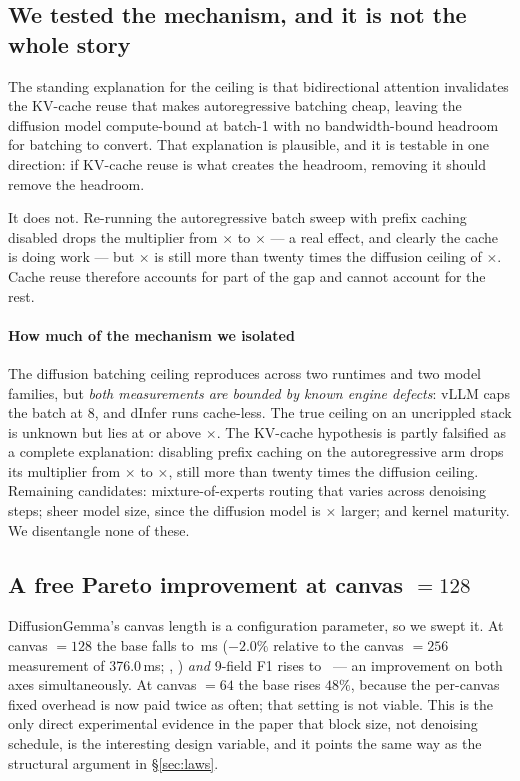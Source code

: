 \subsection{We tested the mechanism, and it is not the whole story}

The standing explanation for the ceiling is that bidirectional attention
invalidates the KV-cache reuse that makes autoregressive batching cheap,
leaving the diffusion model compute-bound at batch-1 with no bandwidth-bound
headroom for batching to convert. That explanation is plausible, and it is
testable in one direction: if KV-cache reuse is what creates the headroom,
removing it should remove the headroom.

It does not. Re-running the autoregressive batch sweep with prefix caching
disabled drops the multiplier from \cacheOnMult$\times$ to
\cacheOffMult$\times$ --- a real effect, and clearly the cache is doing work
--- but \cacheOffMult$\times$ is still more than twenty times the diffusion
ceiling of \dgBatchMult$\times$. Cache reuse therefore accounts for part of
the gap and cannot account for the rest.

\paragraph{How much of the mechanism we isolated}
The diffusion batching ceiling reproduces across two runtimes and two model
families, but \emph{both measurements are bounded by known engine defects}:
vLLM caps the batch at 8, and dInfer runs cache-less. The true ceiling on an
uncrippled stack is unknown but lies at or above \dgBatchVllmHi$\times$.
The KV-cache hypothesis is partly falsified as a complete explanation:
disabling prefix caching on the autoregressive arm drops its multiplier from
\cacheOnMult$\times$ to \cacheOffMult$\times$, still more than twenty times
the diffusion ceiling. Remaining candidates: mixture-of-experts routing that
varies across denoising steps; sheer model size, since the diffusion model
is \footprintRatio$\times$ larger; and kernel maturity. We disentangle none
of these.

\subsection{A free Pareto improvement at canvas $= 128$}

DiffusionGemma's canvas length is a configuration parameter, so we swept it.
At canvas $=128$ the base falls to \canvasOneTwentyEightBase\,ms
($-2.0\%$ relative to the canvas $=256$ measurement of 376.0\,ms;
,
) \emph{and} 9-field F1 rises to
\canvasOneTwentyEightFone\ --- an improvement on both axes simultaneously.
At canvas $=64$ the base rises $48\%$, because the per-canvas fixed overhead
is now paid twice as often; that setting is not viable. This is the only
direct experimental evidence in the paper that block size, not denoising
schedule, is the interesting design variable, and it points the same way as
the structural argument in \S\ref{sec:laws}.

